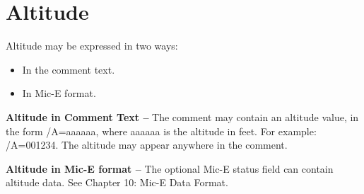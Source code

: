 \section{Altitude}

Altitude may be expressed in two ways:

\begin{itemize}
\item In the comment text.
\item In Mic-E format.
\end{itemize}

\textbf{Altitude in Comment Text --} The comment may contain an altitude value,
in the form /A=aaaaaa, where aaaaaa is the altitude in feet. For example:
/A=001234. The altitude may appear anywhere in the comment.

\textbf{Altitude in Mic-E format --} The optional Mic-E status field can contain
altitude data. See Chapter 10: Mic-E Data Format.

